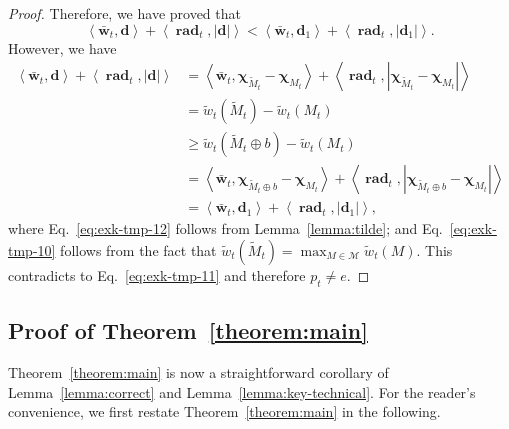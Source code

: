 \documentclass{article}
\newcommand{\M}{\mathcal M}
\DeclareMathOperator{\rad}{rad}
\newcommand{\inn}[1]{\left\langle #1 \right\rangle}
\renewcommand{\vec}[1]{\boldsymbol{#1}}
\begin{document}
\begin{proof}
Therefore, we have proved that 
\begin{equation}
\label{eq:exk-tmp-11}
\inn{\vec {\bar w}_t, \vec d}+\inn{\vec \rad_t,  |\vec d|} < \inn{\vec {\bar w}_t, \vec d_1}+\inn{\vec \rad_t, |\vec d_1|}.
\end{equation}
However, we have
\begin{align}
\inn{\vec {\bar w}_t, \vec d}+\inn{\vec \rad_t,  |\vec d|} 
&= \inn{\vec {\bar w}_t, \vec \chi_{\tilde M_t} - \vec \chi_{M_t}}+\inn{\vec \rad_t,  |\vec \chi_{\tilde M_t} - \vec \chi_{M_t}|}\label{eq:exk-tmp-12}\\
&= \tilde w_t(\tilde M_t) - \tilde w_t(M_t)\nonumber\\
& \ge \tilde w_t(\tilde M_t \oplus b)-\tilde w_t(M_t)\label{eq:exk-tmp-10}\\
&= \inn{\vec {\bar w}_t, \vec \chi_{\tilde M_t \oplus b} - \vec \chi_{M_t}}+\inn{\vec \rad_t,  |\vec \chi_{\tilde M_t \oplus b} - \vec \chi_{M_t}|}\nonumber\\
&= \inn{\vec {\bar w}_t, \vec d_1}+\inn{\vec \rad_t,  |\vec d_1|},
\end{align}
where Eq.~\eqref{eq:exk-tmp-12} follows from Lemma~\ref{lemma:tilde}; and Eq.~\eqref{eq:exk-tmp-10} follows from the fact that $\tilde w_t(\tilde M_t) = \max_{M\in \M} \tilde w_t(M)$.
This contradicts to Eq.~\eqref{eq:exk-tmp-11} and therefore $p_t\not= e$.

\end{proof}


\subsection{Proof of Theorem~\ref{theorem:main}}

Theorem~\ref{theorem:main} is now a straightforward corollary of Lemma~\ref{lemma:correct} and Lemma~\ref{lemma:key-technical}.
For the reader's convenience, we first restate Theorem~\ref{theorem:main} in the following.
\mainresult*
\end{document}
